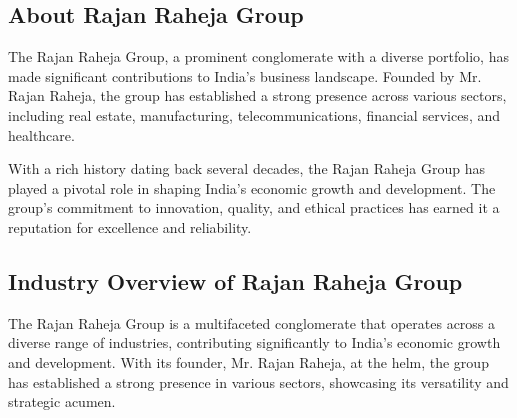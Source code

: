 \subsection{About Rajan Raheja Group}
The Rajan Raheja Group, a prominent conglomerate with a diverse portfolio, has made significant contributions to India's business landscape. Founded by Mr. Rajan Raheja, the group has established a strong presence across various sectors, including real estate, manufacturing, telecommunications, financial services, and healthcare.

With a rich history dating back several decades, the Rajan Raheja Group has played a pivotal role in shaping India's economic growth and development. The group's commitment to innovation, quality, and ethical practices has earned it a reputation for excellence and reliability.\citep{singhemergence}

\subsection{Industry Overview of Rajan Raheja Group}

The Rajan Raheja Group is a multifaceted conglomerate that operates across a diverse range of industries, contributing significantly to India's economic growth and development. With its founder, Mr. Rajan Raheja, at the helm, the group has established a strong presence in various sectors, showcasing its versatility and strategic acumen.

